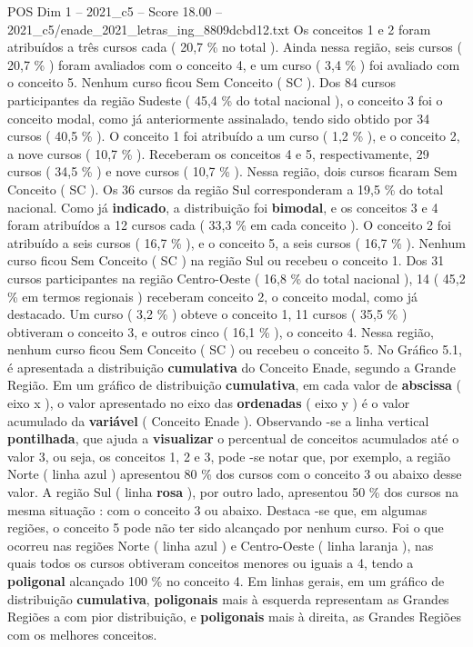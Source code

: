 \begin{textsample}{POS Dim 1 – 2021\_c5 – Score 18.00 – 2021\_c5/enade\_2021\_letras\_ing\_8809dcbd12.txt}
Os conceitos 1 e 2 foram atribuídos a três cursos cada ( 20,7 \% no total ).
Ainda nessa região, seis cursos ( 20,7 \% ) foram avaliados com o conceito 4, e um curso ( 3,4 \% ) foi avaliado com o conceito 5.
Nenhum curso ficou Sem Conceito ( SC ).
Dos 84 cursos participantes da região Sudeste ( 45,4 \% do total nacional ), o conceito 3 foi o conceito modal, como já anteriormente assinalado, tendo sido obtido por 34 cursos ( 40,5 \% ).
O conceito 1 foi atribuído a um curso ( 1,2 \% ), e o conceito 2, a nove cursos ( 10,7 \% ).
Receberam os conceitos 4 e 5, respectivamente, 29 cursos ( 34,5 \% ) e nove cursos ( 10,7 \% ).
Nessa região, dois cursos ficaram Sem Conceito ( SC ).
Os 36 cursos da região Sul corresponderam a 19,5 \% do total nacional.
Como já \textbf{indicado}, a distribuição foi \textbf{bimodal}, e os conceitos 3 e 4 foram atribuídos a 12 cursos cada ( 33,3 \% em cada conceito ).
O conceito 2 foi atribuído a seis cursos ( 16,7 \% ), e o conceito 5, a seis cursos ( 16,7 \% ).
Nenhum curso ficou Sem Conceito ( SC ) na região Sul ou recebeu o conceito 1.
Dos 31 cursos participantes na região Centro-Oeste ( 16,8 \% do total nacional ), 14 ( 45,2 \% em termos regionais ) receberam conceito 2, o conceito modal, como já destacado.
Um curso ( 3,2 \% ) obteve o conceito 1, 11 cursos ( 35,5 \% ) obtiveram o conceito 3, e outros cinco ( 16,1 \% ), o conceito 4.
Nessa região, nenhum curso ficou Sem Conceito ( SC ) ou recebeu o conceito 5.
No Gráfico 5.1, é apresentada a distribuição \textbf{cumulativa} do Conceito Enade, segundo a Grande Região.
Em um gráfico de distribuição \textbf{cumulativa}, em cada valor de \textbf{abscissa} ( eixo x ), o valor apresentado no eixo das \textbf{ordenadas} ( eixo y ) é o valor acumulado da \textbf{variável} ( Conceito Enade ).
Observando -se a linha vertical \textbf{pontilhada}, que ajuda a \textbf{visualizar} o percentual de conceitos acumulados até o valor 3, ou seja, os conceitos 1, 2 e 3, pode -se notar que, por exemplo, a região Norte ( linha azul ) apresentou 80 \% dos cursos com o conceito 3 ou abaixo desse valor.
A região Sul ( linha \textbf{rosa} ), por outro lado, apresentou 50 \% dos cursos na mesma situação : com o conceito 3 ou abaixo.
Destaca -se que, em algumas regiões, o conceito 5 pode não ter sido alcançado por nenhum curso.
Foi o que ocorreu nas regiões Norte ( linha azul ) e Centro-Oeste ( linha laranja ), nas quais todos os cursos obtiveram conceitos menores ou iguais a 4, tendo a \textbf{poligonal} alcançado 100 \% no conceito 4.
Em linhas gerais, em um gráfico de distribuição \textbf{cumulativa}, \textbf{poligonais} mais à esquerda representam as Grandes Regiões a com pior distribuição, e \textbf{poligonais} mais à direita, as Grandes Regiões com os melhores conceitos.

\end{textsample}
